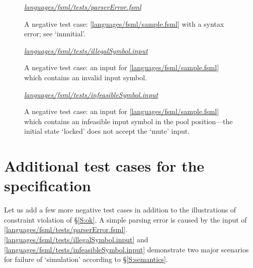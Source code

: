 \documentclass[preprint,authoryear,12pt]{noelsarticle}
\newcommand{\codefigure}[3]{
\begin{figure}[t!]
\begin{boxedminipage}{\hsize}
\mbox{}\hfill{}{\small\textit{\href{http://github.com/slebok/slepro/tree/master/#2}{#2}}}

\end{boxedminipage}
\caption{#1.}
\label{#2}
\medskip
\end{figure}}
\begin{document}

\pagebreak

\codefigure{%
A negative test case: \autoref{languages/fsml/sample.fsml} with a syntax error; see `innnitial'}{%
languages/fsml/tests/parserError.fsml}{%
fsml}

\codefigure{%
A negative test case: an input for
\autoref{languages/fsml/sample.fsml} which contains an invalid input symbol}{%
languages/fsml/tests/illegalSymbol.input}{%
prolog}

\codefigure{%
A negative test case: an input for
\autoref{languages/fsml/sample.fsml} which contains an infeasible
input symbol in the pool position---the initial state `locked' does
not accept the `mute' input}{%
languages/fsml/tests/infeasibleSymbol.input}{%
prolog}

\section{Additional test cases for the specification}
\label{A:testing}

Let us add a few more negative test cases in addition to the
illustrations of constraint violation of \S\ref{S:ok}.  A simple
parsing error is caused by the input of
\autoref{languages/fsml/tests/parserError.fsml}.
\autoref{languages/fsml/tests/illegalSymbol.input} and
\autoref{languages/fsml/tests/infeasibleSymbol.input} demonstrate two
major scenarios for failure of `simulation' according to
\S\ref{S:semantics}.

\end{document}
